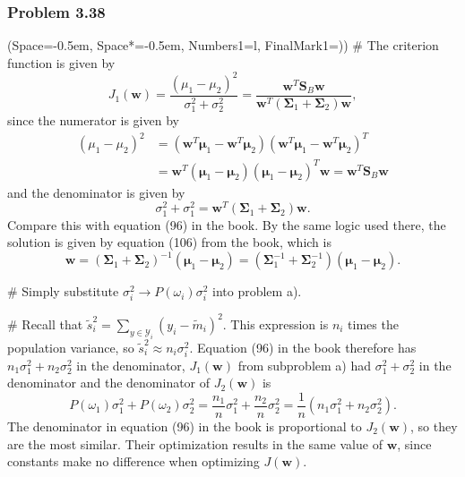 \documentclass[12pt, a4paper]{article}
\newcommand{\listSpace}{-0.5em}%
\newcommand{\vect}[1]{\bm{#1}}
\begin{document}
\subsubsection*{Problem 3.38}
\begin{easylist}[enumerate]
\ListProperties(Space=\listSpace, Space*=\listSpace, Numbers1=l, FinalMark1={)})
# The criterion function is given by
\begin{equation*}
	J_1 (\vect{w}) = \frac{\left( \mu_1 - \mu_2 \right)^2}{\sigma_1^2 + \sigma_2^2} = \frac{\vect{w}^T \vect{S}_B \vect{w}}
	{\vect{w}^T \left( \vect{\Sigma}_1 + \vect{\Sigma}_2 \right)
		\vect{w}},
\end{equation*}
since the numerator is given by
\begin{align*}
	\left( \mu_1 - \mu_2 \right)^2 &= 
	\left( \vect{w}^T \vect{\mu}_1 - \vect{w}^T \vect{\mu}_2 \right)
	\left( \vect{w}^T \vect{\mu}_1 - \vect{w}^T \vect{\mu}_2 \right)^T \\
	&=
	\vect{w}^T 
	\left(  \vect{\mu}_1 -  \vect{\mu}_2 \right)
	\left(  \vect{\mu}_1 -  \vect{\mu}_2 \right)^T
	 \vect{w}
	 =
	 \vect{w}^T 
	\vect{S}_B
	 \vect{w}
\end{align*}
and the denominator is given by
\begin{equation*}
	\sigma_1^2 + \sigma_1^2 = \vect{w}^T 
	\left( \vect{\Sigma}_1 + \vect{\Sigma}_2 \right)
	\vect{w}.
\end{equation*}
Compare this with equation (96) in the book.
By the same logic used there, the solution is given by equation (106) from the book, which is
\begin{equation*}
	\vect{w} = \left(\vect{\Sigma}_1 + \vect{\Sigma}_2 \right)^{-1} \left(  \vect{\mu}_1 -  \vect{\mu}_2 \right)
	=
	\left(\vect{\Sigma}_1^{-1} + \vect{\Sigma}_2^{-1} \right) \left(  \vect{\mu}_1 -  \vect{\mu}_2 \right).
\end{equation*}

# Simply substitute $\sigma_i^2 \to P(\omega_i) \sigma_i^2$ into problem a).

# Recall that $\tilde{s}_i^2 = \sum_{y \in \mathcal{Y}_i} (y_i - \tilde{m}_i)^2$. 
This expression is $n_i$ times the population variance, so $\tilde{s}_i^2 \approx n_i \sigma_i^2$.
Equation (96) in the book therefore has $n_1 \sigma_1^2 + n_2 \sigma_2^2$ in the denominator, $J_1 (\vect{w})$ from subproblem a) had $ \sigma_1^2 +  \sigma_2^2$ in the denominator and the denominator of $J_2 (\vect{w})$ is
\begin{equation*}
	P(\omega_1) \sigma_1^2 + P(\omega_2) \sigma_2^2 = 
	\frac{n_1}{n} \sigma_1^2 + \frac{n_2}{n} \sigma_2^2
	= \frac{1}{n} \left( n_1 \sigma_1^2 + n_2 \sigma_2^2 \right).
\end{equation*}
The denominator in equation (96) in the book is proportional to $J_2 (\vect{w})$, so they are the most similar.
Their optimization results in the same value of $\vect{w}$, since constants make no difference when optimizing $J(\vect{w})$.
\end{easylist}
\end{document}
